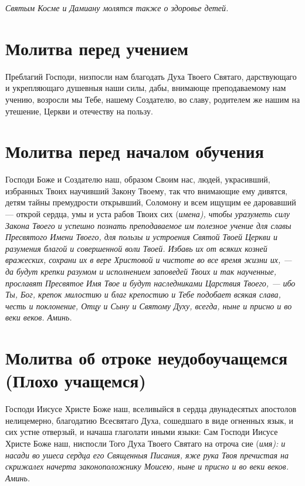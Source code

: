 \itshape Святым Косме и Дамиану молятся также о здоровье детей.\normalfont{} 

 




  

\section{Молитва перед учением}
 


Преблагий Господи, низпосли нам благодать Духа Твоего Святаго, дарствующаго и укрепляющаго душевныя наши силы, дабы, внимающе преподаваемому нам учению, возросли мы Тебе, нашему Создателю, во славу, родителем же нашим на утешение, Церкви и отечеству на пользу.


\section{Молитва перед началом обучения}
 


Господи Боже и Создателю наш, образом Своим нас, людей, украсивший, избранных Твоих научивший Закону Твоему, так что внимающие ему дивятся, детям тайны премудрости открывший, Соломону и всем ищущим ее даровавший — открой сердца, умы и уста рабов Твоих сих (\itshape имена\normalfont{}), чтобы уразуметь силу Закона Твоего и успешно познать преподаваемое им полезное учение для славы Пресвятого Имени Твоего, для пользы и устроения Святой Твоей Церкви и разумения благой и совершенной воли Твоей. Избавь их от всяких козней вражеских, сохрани их в вере Христовой и чистоте во все время жизни их, — да будут крепки разумом и исполнением заповедей Твоих и так наученные, прославят Пресвятое Имя Твое и будут наследниками Царствия Твоего, — ибо Ты, Бог, крепок милостию и благ крепостию и Тебе подобает всякая слава, честь и поклонение, Отцу и Сыну и Святому Духу, всегда, ныне и присно и во веки веков. Аминь.


\section{Молитва об отроке неудобоучащемся (Плохо учащемся)}
 
Господи Иисусе Христе Боже наш, вселивыйся в сердца двунадесятых апостолов нелицемерно, благодатию Всесвятаго Духа, сошедшаго в виде огненных язык, и сих устне отверзый, и начаша глаголати иными языки: Сам Господи Иисусе Христе Боже наш, ниспосли Того Духа Твоего Святаго на отроча сие (\itshape имя\normalfont{}): и насади во ушеса сердца его Священныя Писания, яже рука Твоя пречистая на скрижалех начерта законоположнику Моисею, ныне и присно и во веки веков. Аминь.

